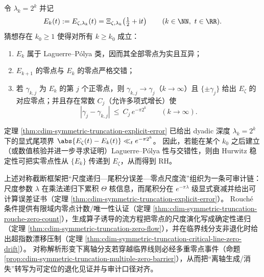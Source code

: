 \begin{conjecture}\label{conj:cdim-symmetric-truncation-dyadic-lp-interlacing}
令 \(\lambda_k=2^k\) 并记
\[
E_k(t):=E_{\zeta,\lambda_k}(t)=\Xi_{\zeta,\lambda_k}\!\left(\tfrac12+\mathrm{i}t\right)
\qquad(k\in\NN,\ t\in\RR).
\]
猜想存在 \(k_0\ge 1\) 使得对所有 \(k\ge k_0\) 成立：
\begin{enumerate}
  \item \(E_k\) 属于 Laguerre--P\'olya 类，因而其全部零点为实且互异；
  \item \(E_{k+1}\) 的零点与 \(E_k\) 的零点严格交错；
  \item 若 \(\gamma_{k,j}\) 为 \(E_k\) 的第 \(j\) 个正零点，则 \(\gamma_{k,j}\to\gamma_j\)（\(k\to\infty\)）且 \(\{\pm\gamma_j\}\) 给出 \(E_\zeta\) 的对应零点；并且存在常数 \(C_j\)（允许多项式增长）使
  \[
  |\gamma_j-\gamma_{k,j}|\ \le\ C_j\,e^{-\pi 2^k}\qquad(k\to\infty).
  \]
\end{enumerate}
\end{conjecture}

\begin{remark}[交错猜想的可核验性]\label{rem:cdim-symmetric-truncation-dyadic-lp-auditability}
定理 \ref{thm:cdim-symmetric-truncation-explicit-error} 已给出 dyadic 深度 \(\lambda_k=2^k\) 下的显式尾项界 \(\abs{E_\zeta(t)-E_k(t)}\ll_{t}e^{-\pi 2^k}\)。
因此，若能在某个 \(k_0\) 之后建立（或数值核验并进一步寻求证明）Laguerre--P\'olya 性与交错性，则由 Hurwitz 稳定性可把实零点性从 \(\{E_k\}\) 传递到 \(E_\zeta\)，从而得到 RH。
\end{remark}

上述对称截断框架把“尺度递归—尾积分误差—零点尺度流”组织为一条可审计链：尺度参数 \(\lambda\) 在乘法递归下累积 \(\Theta\) 核信息，而尾积分在 \(e^{-\pi\lambda}\) 级显式衰减并给出可计算误差证书（定理 \ref{thm:cdim-symmetric-truncation-explicit-error}）。
Rouch\'e 条件提供有限域内零点计数/唯一性认证（定理 \ref{thm:cdim-symmetric-truncation-rouche-zero-count}），生成算子诱导的流方程把零点的尺度演化写成确定性递归（定理 \ref{thm:cdim-symmetric-truncation-zero-flow}），并在临界线分支非退化时给出超指数漂移压制（定理 \ref{thm:cdim-symmetric-truncation-critical-line-zero-drift}）。
对称解析形变下离轴分支若穿越临界线则必经多重零点事件（命题 \ref{prop:cdim-symmetric-truncation-multiple-zero-barrier}），从而把“离轴生成/消失”转写为可定位的退化见证并与审计口径对齐。

\endinput

